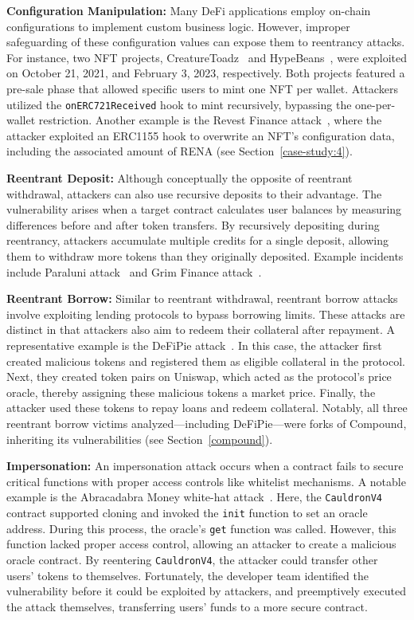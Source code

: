 \textbf{Configuration Manipulation:}
Many DeFi applications employ on-chain configurations to implement custom business logic. However, improper safeguarding of these configuration values can expose them to reentrancy attacks. For instance, two NFT projects, CreatureToadz~\cite{attack-report:creature-toadz} and HypeBeans~\cite{attack-report:hype-beans}, were exploited on October 21, 2021, and February 3, 2023, respectively. Both projects featured a pre-sale phase that allowed specific users to mint one NFT per wallet. Attackers utilized the \lstinline{onERC721Received} hook to mint recursively, bypassing the one-per-wallet restriction. Another example is the Revest Finance attack~\cite{attack-report:revest-finance}, where the attacker exploited an ERC1155 hook to overwrite an NFT's configuration data, including the associated amount of RENA (see Section~\ref{case-study:4}).

\textbf{Reentrant Deposit:}
Although conceptually the opposite of reentrant withdrawal, attackers can also use recursive deposits to their advantage. The vulnerability arises when a target contract calculates user balances by measuring differences before and after token transfers. By recursively depositing during reentrancy, attackers accumulate multiple credits for a single deposit, allowing them to withdraw more tokens than they originally deposited. Example incidents include Paraluni attack~\cite{attack-report:paraluni} and Grim Finance attack~\cite{attack-report:grim-finance}.

\textbf{Reentrant Borrow:}
Similar to reentrant withdrawal, reentrant borrow attacks involve exploiting lending protocols to bypass borrowing limits. These attacks are distinct in that attackers also aim to redeem their collateral after repayment. A representative example is the DeFiPie attack~\cite{attack-report:defipie}. In this case, the attacker first created malicious tokens and registered them as eligible collateral in the protocol. Next, they created token pairs on Uniswap, which acted as the protocol's price oracle, thereby assigning these malicious tokens a market price. Finally, the attacker used these tokens to repay loans and redeem collateral. Notably, all three reentrant borrow victims analyzed—including DeFiPie—were forks of Compound, inheriting its vulnerabilities (see Section~\ref{compound}).

\textbf{Impersonation:}
\label{attack-strategy:impersonation}
An impersonation attack occurs when a contract fails to secure critical functions with proper access controls like whitelist mechanisms. A notable example is the Abracadabra Money white-hat attack~\cite{attack-report:abracadabra-money}. Here, the \lstinline{CauldronV4} contract supported cloning and invoked the \lstinline{init} function to set an oracle address. During this process, the oracle's \lstinline{get} function was called. However, this function lacked proper access control, allowing an attacker to create a malicious oracle contract. By reentering \lstinline{CauldronV4}, the attacker could transfer other users' tokens to themselves. Fortunately, the developer team identified the vulnerability before it could be exploited by attackers, and preemptively executed the attack themselves, transferring users' funds to a more secure contract.

